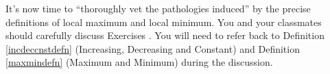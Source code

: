 {\noindent It's now time to ``thoroughly vet the pathologies induced'' by the precise definitions of local maximum and local minimum.  You and your classmates should carefully discuss Exercises}
{.  You will need to refer back to Definition \ref{incdeccnstdefn} (Increasing, Decreasing and Constant) and Definition \ref{maxmindefn} (Maximum and Minimum) during the discussion.}
